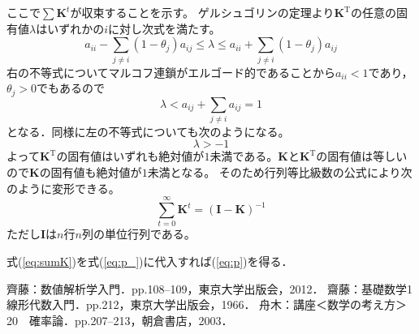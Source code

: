 \documentclass{jarticle}
\numberwithin{equation}{section}
\numberwithin{table}{section}
\theoremstyle{plain}
\begin{document}
ここで$ \sum \bm{K}^t $が収束することを示す。
ゲルシュゴリンの定理\cite{bib:s_saito}より$ \bm{K}^\mathrm{T} $の任意の固有値$ \lambda $はいずれかの$ i $に対し次式を満たす。
\begin{equation*}
    a_{i i} - \sum_{j \ne i}(1 - \theta_j) a_{i j} \le \lambda \le a_{i i} + \sum_{j \ne i}(1 - \theta_j) a_{i j}
\end{equation*}
右の不等式についてマルコフ連鎖がエルゴード的であることから$ a_{i i} < 1 $\cite{bib:funaki}であり，$ \theta_j > 0 $でもあるので
\begin{equation*}
    \lambda < a_{i j} + \sum_{j \ne i} a_{i j} = 1
\end{equation*}
となる．同様に左の不等式についても次のようになる。
\begin{equation*}
    \lambda > -1
\end{equation*}
よって$ \bm{K}^\mathrm{T} $の固有値はいずれも絶対値が$ 1 $未満である。$ \bm{K} $と$ \bm{K}^\mathrm{T} $の固有値は等しいので$ \bm{K} $の固有値も絶対値が$ 1 $未満となる。
そのため行列等比級数の公式\cite{bib:m_saito}により次のように変形できる。
\begin{equation} \label{eq:sumK}
    \sum_{t=0}^{\infty} \bm{K}^t = (\bm{I} - \bm{K})^{-1}
\end{equation}
ただし$ \bm{I} $は$n$行$n$列の単位行列である。

式(\ref{eq:sumK})を式(\ref{eq:p_})に代入すれば(\ref{eq:p})を得る．\QED

\begin{thebibliography}{99}
    齊藤：数値解析学入門．pp.108--109，東京大学出版会，2012．
    齋藤：基礎数学1　線形代数入門．pp.212，東京大学出版会，1966．
    舟木：講座＜数学の考え方＞20　確率論．pp.207--213，朝倉書店，2003．
\end{thebibliography}
    
\end{document}
